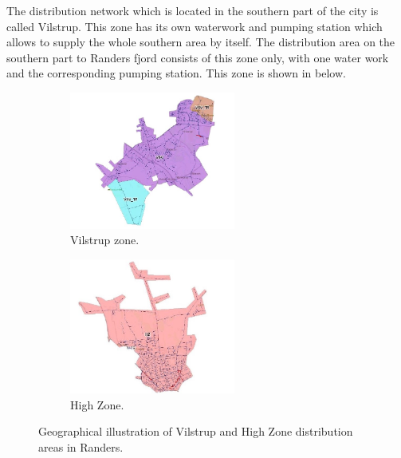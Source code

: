 The distribution network which is located in the southern part of the city is called Vilstrup. This zone has its own waterwork and pumping station which allows to supply the whole southern area by itself. The distribution area on the southern part to Randers fjord consists of this zone only, with one water work and the corresponding pumping station. This zone is shown in  below.

\begin{figure}[H]
\centering
\begin{subfigure}{.49\textwidth}
\centering
\includegraphics[width=0.6\textwidth]{report/pictures/Vilstrup_region}
  \caption{Vilstrup zone.}
  \label{fig:vilstrup_region}
\end{subfigure}
\begin{subfigure}{.49\textwidth}
\centering
\includegraphics[width=0.6\textwidth]{report/pictures/Highzone_region}
  \caption{High Zone.}
  \label{fig:highzone_region}
\end{subfigure}
\caption{Geographical illustration of Vilstrup and High Zone distribution areas in Randers.}
\label{fig:vsv_hz_pic}
\end{figure}

\vspace{-3mm}

